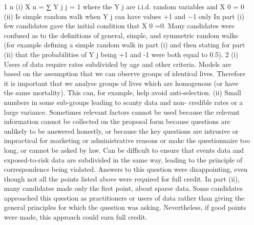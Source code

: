 \documentclass[a4paper,12pt]{article}
\begin{document}
1
n
(i)
X n = ∑ Y j
j = 1
where the Y j are i.i.d. random variables and X 0 = 0
(ii)
Is simple random walk when Y j can have values +1 and −1 only
In part (i) few candidates gave the initial condition that X 0 =0. Many candidates were
confused as to the definitions of general, simple, and symmetric random walks (for example
defining a simple random walk in part (i) and then stating for part (ii) that the probabilities
of Y j being +1 and -1 were both equal to 0.5).
2
(i)
Users of data require rates subdivided by age and other criteria.
Models are based on the assumption that we can observe groups of identical lives.
Therefore it is important that we analyse groups of lives which are homogenous (or
have the same mortality).
This can, for example, help avoid anti-selection.
(ii)
Small numbers in some sub-groups leading to scanty data and non-
credible rates or a large variance.
Sometimes relevant factors cannot be used because the relevant information cannot be
collected on the proposal form because questions are unlikely to be answered
honestly,
or because the key questions are intrusive or impractical for marketing or
administrative reasons or make the questionnaire too long, or cannot be asked by law.
Can be difficult to ensure that events data and exposed-to-risk data are subdivided in
the same way, leading to the principle of correspondence being violated.
Answers to this question were disappointing, even though not all the points listed above were required for full credit. In part (ii), many candidates made only the first point, about sparse
data. Some candidates approached this question as practitioners or users of data rather than giving the general principles for which the question was asking. Nevertheless, if good points
were made, this approach could earn full credit.
\end{document}
